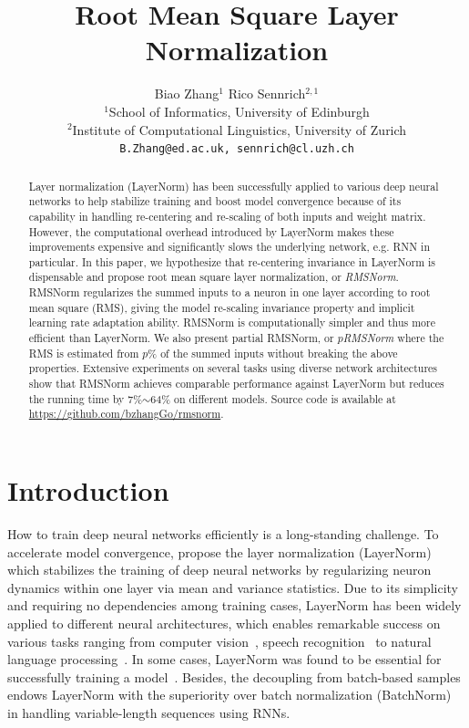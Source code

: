 \documentclass{article}
\title{Root Mean Square Layer Normalization}
\author{
  }
\author{
  Biao Zhang$^1$ \quad Rico Sennrich$^{2,1}$ \\
  $^1$School of Informatics, University of Edinburgh \\
  $^2$Institute of Computational Linguistics, University of Zurich \\
  \texttt{B.Zhang@ed.ac.uk, sennrich@cl.uzh.ch}
}
\begin{document}
\maketitle

\begin{abstract}

Layer normalization (LayerNorm) has been successfully applied to various deep neural networks to help stabilize training and boost model convergence because of its capability in handling re-centering and re-scaling of both inputs and weight matrix. 
However, the computational overhead introduced by LayerNorm makes these improvements expensive and significantly slows the underlying network, e.g. RNN in particular.  
In this paper, we hypothesize that re-centering invariance in LayerNorm is dispensable and propose root mean square layer normalization, or \textit{RMSNorm}. RMSNorm regularizes the summed inputs to a neuron in one layer according to root mean square (RMS), giving the model re-scaling invariance property and implicit learning rate adaptation ability.
RMSNorm is computationally simpler and thus more efficient than LayerNorm.
We also present partial RMSNorm, or \textit{$p$RMSNorm} where the RMS is estimated from $p$\% of the summed inputs without breaking the above properties.
Extensive experiments on several tasks using diverse network architectures show that RMSNorm achieves comparable performance against LayerNorm but reduces the running time by 7\%$\sim$64\% on different models. Source code is available at \url{https://github.com/bzhangGo/rmsnorm}.
\end{abstract}

\section{Introduction}

How to train deep neural networks efficiently is a long-standing challenge. To accelerate model convergence, \citet{ba2016layer} propose the layer normalization (LayerNorm) which stabilizes the training of deep neural networks by regularizing neuron dynamics within one layer via mean and variance statistics. Due to its simplicity and requiring no dependencies among training cases, LayerNorm has been widely applied to different neural architectures, which enables remarkable success on various tasks ranging from computer vision~\cite{parmar2018image,sharma2018conceptual}, speech recognition~\cite{zhou2018syllable} to natural language processing~\cite{NIPS2017_7181,zhang2019lightweight}. In some cases, LayerNorm was found to be essential for successfully training a model~\cite{P18-1008}. Besides, the decoupling from batch-based samples endows LayerNorm with the superiority over batch normalization (BatchNorm)~\cite{Ioffe:2015:BNA:3045118.3045167} in handling variable-length sequences using RNNs.
\end{document}
